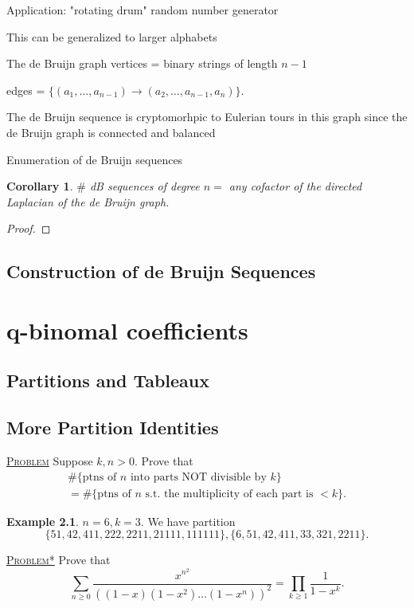 \documentclass{report}
\newcommand{\fancyem}[1]{\underline{\textsc{#1}}}
\newtheorem{corollary}{Corollary}[section]
\theoremstyle{definition}
\newtheorem{example}{Example}[section]
\theoremstyle{remark}
\numberwithin{equation}{section}
\newcommand*\ttlmath[2]{\texorpdfstring{$\boldsymbol{#1}$}{#2}}
\begin{document}
Application: "rotating drum" random number generator


This can be generalized to larger alphabets

The de Bruijn graph
vertices = binary strings of length $n - 1$

edges = $\{(a_1,\ldots, a_{n-1}) \to (a_2, \ldots, a_{n-1}, a_n)\}$.

The de Bruijn sequence is cryptomorhpic to Eulerian tours in this graph since the de Bruijn graph is connected and balanced 

Enumeration of de Bruijn sequences
\begin{corollary}
    $\#$ dB sequences of degree $n = $ any cofactor of the directed Laplacian of the de Bruijn graph.
\end{corollary}

\begin{proof}

\end{proof}
\section{Construction of de Bruijn Sequences}

\chapter{\ttlmath{q}{q}-binomal coefficients}
\section{Partitions and Tableaux}
\section{More Partition Identities}
\fancyem{Problem} Suppose $k, n > 0$. Prove that \begin{multline*}
    \#\{\text{ptns of $n$ into parts NOT divisible by $k$}\} \\ 
    = \#\{\text{ptns of $n$ s.t. the multiplicity of each part is $< k$}\}.
\end{multline*}
\begin{example}
    $n = 6, k = 3$. We have partition
    \[
        \{51, 42, 411, 222, 2211, 21111, 111111\}, \{6, 51, 42, 411, 33, 321, 2211\}.
    \]
\end{example}
\fancyem{Problem*} Prove that 
\[
    \sum_{n \geq 0} \frac{x^{n^2}}{((1-x)(1-x^2)\ldots(1-x^n))^2} = \prod_{k \geq 1}\frac{1}{1-x^k}.    
\]
\end{document}
